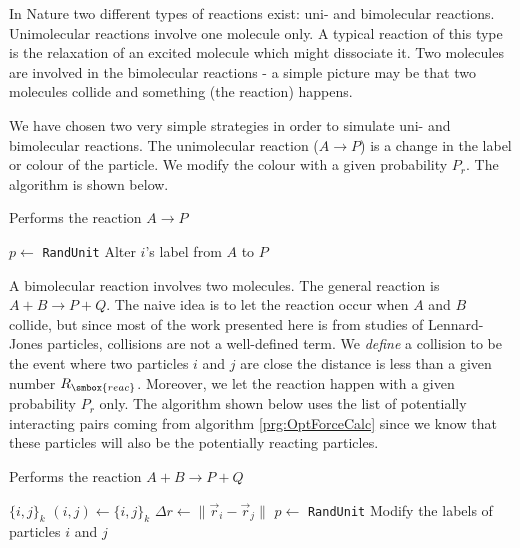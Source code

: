 In Nature two different types of reactions exist: uni- and
bimolecular reactions. Unimolecular reactions involve one molecule
only. A typical reaction of this type is the relaxation of an excited
molecule which might dissociate it. Two molecules are involved in the
bimolecular reactions - a simple picture may be that two molecules collide
and something (the reaction) happens.

We have chosen two very simple strategies in order to simulate uni-
and bimolecular reactions. The unimolecular reaction ($A\rightarrow
P$) is a change in the label or colour of the particle. We modify the
colour with a given probability $P_r$. The algorithm is shown below.

\begin{algorithm}
  \caption[Performs the reaction $A\rightarrow P$]{Performs the reaction $A\rightarrow P$} 
  \label{prg:uni}  
  \begin{algorithmic}
      \STATE $p \leftarrow$ \texttt{RandUnit} 
        \STATE Alter $i$'s label from $A$ to $P$
      \ENDIF
    \ENDFOR
  \end{algorithmic}
\end{algorithm}

A bimolecular reaction involves two
molecules. The general reaction is $A + B \rightarrow P + Q$. The
naive idea is to let the reaction occur when $A$ and $B$ collide, but
since most of the work presented here is from studies of Lennard-Jones
particles, collisions are not a well-defined term. We \textit{define}
a collision to be the event where two particles $i$ and $j$ are close
\ie the distance is less than a given number $R_{\smbox{reac}}$. Moreover,
we let the reaction happen with a given probability $P_r$ only. The
algorithm shown below uses the list of potentially interacting pairs
coming from algorithm \ref{prg:OptForceCalc} since we know that these
particles will also be the potentially reacting particles.

\begin{algorithm}
  \caption[Performs the reaction $A+B\rightarrow P+Q$]{Performs the reaction $A+B\rightarrow P+Q$}
  \label{prg:bi}
  \begin{algorithmic}
    \REQUIRE $\{i, j\}_k$
      \STATE $(i, j) \leftarrow \{i, j\}_k$
      \STATE $\Delta r \leftarrow \|\vec{r}_i-\vec{r}_j\|$
        \STATE $p \leftarrow$ \texttt{RandUnit}
          \STATE Modify the labels of particles $i$ and $j$
        \ENDIF
      \ENDIF
    \ENDFOR
  \end{algorithmic}
\end{algorithm}

